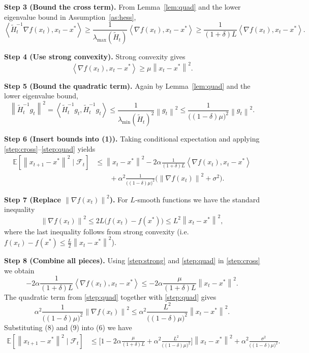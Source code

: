 \documentclass[11pt]{article}
\newcommand{\E}{\mathbb{E}}
\newcommand{\norm}[1]{\left\|#1\right\|}
\newcommand{\ip}[2]{\left\langle #1,#2\right\rangle}
\newcommand{\grad}{\nabla}
\begin{document}
\bigskip
\noindent\textbf{Step 3 (Bound the cross term).}  
From Lemma~\ref{lem:quad} and the lower eigenvalue bound in Assumption~\ref{as:hess},
\[
\ip{\widetilde H_{t}^{-1}\grad f(x_{t})}{x_{t}-x^{*}}
\ge \frac{1}{\lambda_{\max}(\widetilde H_{t})}
\ip{\grad f(x_{t})}{x_{t}-x^{*}}
\ge \frac{1}{(1+\delta)L}\ip{\grad f(x_{t})}{x_{t}-x^{*}}.
\tag{3}
\]
\label{step:cross}

\bigskip
\noindent\textbf{Step 4 (Use strong convexity).}  
Strong convexity gives
\[
\ip{\grad f(x_{t})}{x_{t}-x^{*}}\ge \mu\norm{x_{t}-x^{*}}^{2}.
\tag{4}
\]
\label{step:strong}

\bigskip
\noindent\textbf{Step 5 (Bound the quadratic term).}  
Again by Lemma~\ref{lem:quad} and the lower eigenvalue bound,
\[
\norm{\widetilde H_{t}^{-1}g_{t}}^{2}
= \ip{\widetilde H_{t}^{-1}g_{t}}{\widetilde H_{t}^{-1}g_{t}}
\le \frac{1}{\lambda_{\min}(\widetilde H_{t})^{2}}\norm{g_{t}}^{2}
\le\frac{1}{\big((1-\delta)\mu\big)^{2}}\norm{g_{t}}^{2}.
\tag{5}
\]
\label{step:quad}

\bigskip
\noindent\textbf{Step 6 (Insert bounds into (1)).}  
Taking conditional expectation and applying \eqref{step:cross}–\eqref{step:quad} yields
\[
\begin{aligned}
\E\!\left[\norm{x_{t+1}-x^{*}}^{2}\mid\mathcal{F}_{t}\right]
&\le \norm{x_{t}-x^{*}}^{2}
-2\alpha\frac{1}{(1+\delta)L}\ip{\grad f(x_{t})}{x_{t}-x^{*}}\\
&\qquad+\alpha^{2}\frac{1}{\big((1-\delta)\mu\big)^{2}}
\Big(\norm{\grad f(x_{t})}^{2}+\sigma^{2}\Big).
\end{aligned}
\tag{6}
\]

\bigskip
\noindent\textbf{Step 7 (Replace $\norm{\grad f(x_{t})}^{2}$).}  
For $L$‑smooth functions we have the standard inequality
\[
\norm{\grad f(x_{t})}^{2}\le 2L\big(f(x_{t})-f(x^{*})\big)
\le L^{2}\norm{x_{t}-x^{*}}^{2},
\tag{7}
\]
where the last inequality follows from strong convexity (i.e. $f(x_{t})-f(x^{*})\le \frac{L}{2}\norm{x_{t}-x^{*}}^{2}$).  

\bigskip
\noindent\textbf{Step 8 (Combine all pieces).}  
Using \eqref{step:strong} and \eqref{step:quad} in \eqref{step:cross} we obtain
\[
-2\alpha\frac{1}{(1+\delta)L}\ip{\grad f(x_{t})}{x_{t}-x^{*}}
\le -2\alpha\frac{\mu}{(1+\delta)L}\norm{x_{t}-x^{*}}^{2}.
\tag{8}
\]
The quadratic term from \eqref{step:quad} together with \eqref{step:quad} gives
\[
\alpha^{2}\frac{1}{\big((1-\delta)\mu\big)^{2}}\norm{\grad f(x_{t})}^{2}
\le \alpha^{2}\frac{L^{2}}{\big((1-\delta)\mu\big)^{2}}\norm{x_{t}-x^{*}}^{2}.
\tag{9}
\]
Substituting (8) and (9) into (6) we have
\[
\begin{aligned}
\E\!\left[\norm{x_{t+1}-x^{*}}^{2}\mid\mathcal{F}_{t}\right]
&\le\Bigg[1-2\alpha\frac{\mu}{(1+\delta)L}
+\alpha^{2}\frac{L^{2}}{\big((1-\delta)\mu\big)^{2}}\Bigg]\norm{x_{t}-x^{*}}^{2}
+\alpha^{2}\frac{\sigma^{2}}{\big((1-\delta)\mu\big)^{2}}.
\end{aligned}
\tag{10}
\]
\end{document}
